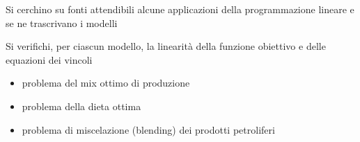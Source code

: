 \documentclass{beamer}
\begin{document}
\generatitolo

\begin{frame}{\approfondimenti}

Si cerchino su fonti attendibili alcune applicazioni
della programmazione lineare e se ne trascrivano i modelli

Si verifichi, per ciascun modello, la linearit\`a della funzione obiettivo
e delle equazioni dei vincoli
\begin{itemize}
\item problema del mix ottimo di produzione
\item problema della dieta ottima 
\item problema di miscelazione (blending) dei prodotti petroliferi
\end{itemize}
\end{frame}
\end{document}
